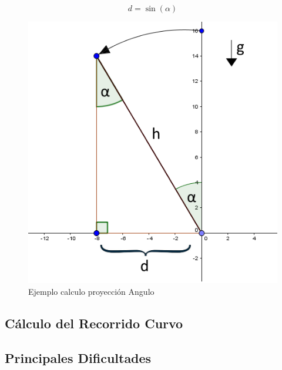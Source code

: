 \documentclass[12pt,a4paper]{article}
\begin{document}
			\begin{figure}[H]
				\begin{equation}
					\label{eq:proyeccion}
					d=\sin(\alpha)
				\end{equation}
			\end{figure}
			
			\begin{figure}[H]
				\centering
				\includegraphics[scale=0.5]{images/calculoProyeccion}
				\caption{Ejemplo calculo proyección Angulo}
				\label{fig:proyeccion}
			\end{figure}
			
			\subsection{Cálculo del Recorrido Curvo}
			
			
			
			\subsection{Principales Dificultades}
\end{document}
